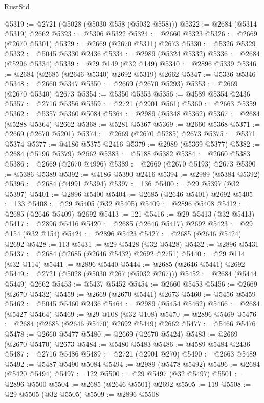 \begin{lexlean}{RustStd}
\begin{coremodule}
@5319 := @2721 (@5028 (@5030 @558 (@5032 @558)))
@5322 := @2684 (@5314 @5319) @2662
@5323 := @5306 @5322
@5324 := @2660 @5323
@5326 := @2669 (@2670 @5301)
@5329 := @2669 (@2670 @5311) @2673
@5330 := @5326 @5329
@5332 := @5045 @5330 @2436
@5334 := @2989 (@5324 @5332)
@5336 := @2684 (@5296 @5334)
@5339 := @29 @149 (@32 @149)
@5340 := @2896 @5339
@5346 := @2684 (@2685 (@2646 @5340) @2692 @5319) @2662
@5347 := @5336 @5346
@5348 := @2660 @5347
@5350 := @2669 (@2670 @5293)
@5353 := @2669 (@2670 @5340) @2673
@5354 := @5350 @5353
@5356 := @4589 @5354 @2436
@5357 := @2716 @5356
@5359 := @2721 (@2901 @561)
@5360 := @2663 @5359
@5362 := @5357 @5360 @5084
@5364 := @2989 (@5348 @5362)
@5367 := @2684 (@5288 @5364) @2662
@5368 := @5281 @5367
@5369 := @2660 @5368
@5371 := @2669 (@2670 @5201)
@5374 := @2669 (@2670 @5285) @2673
@5375 := @5371 @5374
@5377 := @4186 @5375 @2416
@5379 := @2989 (@5369 @5377)
@5382 := @2684 (@5196 @5379) @2662
@5383 := @5188 @5382
@5384 := @2660 @5383
@5386 := @2669 (@2670 @4996)
@5389 := @2669 (@2670 @5193) @2673
@5390 := @5386 @5389
@5392 := @4186 @5390 @2416
@5394 := @2989 (@5384 @5392)
@5396 := @2684 (@4991 @5394)
@5397 := 136
@5400 := @29 @5397 (@32 @5397)
@5401 := @2896 @5400
@5404 := @2685 (@2646 @5401) @2692
@5405 := 133
@5408 := @29 @5405 (@32 @5405)
@5409 := @2896 @5408
@5412 := @2685 (@2646 @5409) @2692
@5413 := 121
@5416 := @29 @5413 (@32 @5413)
@5417 := @2896 @5416
@5420 := @2685 (@2646 @5417) @2692
@5423 := @29 @154 (@32 @154)
@5424 := @2896 @5423
@5427 := @2685 (@2646 @5424) @2692
@5428 := 113
@5431 := @29 @5428 (@32 @5428)
@5432 := @2896 @5431
@5437 := @2684 (@2685 (@2646 @5432) @2692 @2751)
@5440 := @29 @114 (@32 @114)
@5441 := @2896 @5440
@5444 := @2685 (@2646 @5441) @2692
@5449 := @2721 (@5028 (@5030 @267 (@5032 @267)))
@5452 := @2684 (@5444 @5449) @2662
@5453 := @5437 @5452
@5454 := @2660 @5453
@5456 := @2669 (@2670 @5432)
@5459 := @2669 (@2670 @5441) @2673
@5460 := @5456 @5459
@5462 := @5045 @5460 @2436
@5464 := @2989 (@5454 @5462)
@5466 := @2684 (@5427 @5464)
@5469 := @29 @108 (@32 @108)
@5470 := @2896 @5469
@5476 := @2684 (@2685 (@2646 @5470) @2692 @5449) @2662
@5477 := @5466 @5476
@5478 := @2660 @5477
@5480 := @2669 (@2670 @5424)
@5483 := @2669 (@2670 @5470) @2673
@5484 := @5480 @5483
@5486 := @4589 @5484 @2436
@5487 := @2716 @5486
@5489 := @2721 (@2901 @270)
@5490 := @2663 @5489
@5492 := @5487 @5490 @5084
@5494 := @2989 (@5478 @5492)
@5496 := @2684 (@5420 @5494)
@5497 := 122
@5500 := @29 @5497 (@32 @5497)
@5501 := @2896 @5500
@5504 := @2685 (@2646 @5501) @2692
@5505 := 119
@5508 := @29 @5505 (@32 @5505)
@5509 := @2896 @5508

\end{coremodule}
\end{lexlean}
